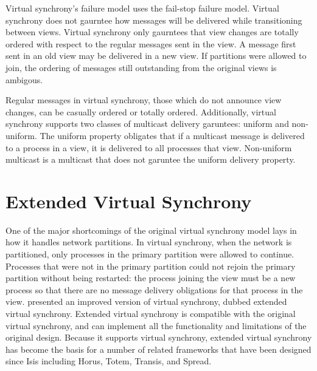 Virtual synchrony's failure model uses the fail-stop failure model. Virtual synchrony does not gaurntee how messages will be delivered while transitioning between views. Virtual synchrony only gaurntees that view changes are totally ordered with respect to the regular messages sent in the view. A message first sent in an old view may be delivered in a new view. If partitions were allowed to join, the ordering of messages still outstanding from the original views is ambigous.

Regular messages in virtual synchrony, those which do not announce view changes, can be casually ordered or totally ordered. Additionally, virtual synchrony supports two classes of multicast delivery garuntees: uniform and non-uniform. The uniform property obligates that if a multicast message is delivered to a process in a view, it is delivered to all processes that view. Non-uniform multicast is a multicast that does not garuntee the uniform delivery property.

\section{Extended Virtual Synchrony}
One of the major shortcomings of the original virtual synchrony model lays in how it handles network partitions. In virtual synchrony, when the network is partitioned, only processes in the primary partition were allowed to continue. Processes that were not in the primary partition could not rejoin the primary partition without being restarted: the process joining the view must be a new process so that there are no message delivery obligations for that process in the view. \cite{EXTENDEDVIRTUALSYNCHRONY} presented an improved version of virtual synchrony, dubbed extended virtual synchrony. Extended virtual synchrony is compatible with the original virtual synchrony, and can implement all the functionality and limitations of the original design. Because it supports virtual synchrony, extended virtual synchrony has become the basis for a number of related frameworks that have been designed since Isis including Horus, Totem, Transis, and Spread.

